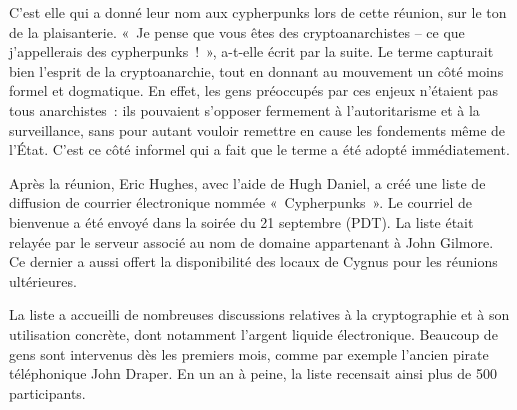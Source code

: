 C'est elle qui a donné leur nom aux cypherpunks lors de cette réunion, sur le ton de la plaisanterie. «~Je pense que vous êtes des cryptoanarchistes -- ce que j'appellerais des cypherpunks~!~», a-t-elle écrit par la suite. Le terme capturait bien l'esprit de la cryptoanarchie, tout en donnant au mouvement un côté moins formel et dogmatique. En effet, les gens préoccupés par ces enjeux n'étaient pas tous anarchistes~: ils pouvaient s'opposer fermement à l'autoritarisme et à la surveillance, sans pour autant vouloir remettre en cause les fondements même de l'État. C'est ce côté informel qui a fait que le terme a été adopté immédiatement. %

Après la réunion, Eric Hughes, avec l'aide de Hugh Daniel, a créé une liste de diffusion de courrier électronique nommée «~Cypherpunks~». Le courriel de bienvenue a été envoyé dans la soirée du 21 septembre (PDT). La liste était relayée par le serveur associé au nom de domaine  appartenant à John Gilmore. Ce dernier a aussi offert la disponibilité des locaux de Cygnus pour les réunions ultérieures.

La liste a accueilli de nombreuses discussions relatives à la cryptographie et à son utilisation concrète, dont notamment l'argent liquide électronique. Beaucoup de gens sont intervenus dès les premiers mois, comme par exemple l'ancien pirate téléphonique John Draper. En un an à peine, la liste recensait ainsi plus de 500 participants. %

